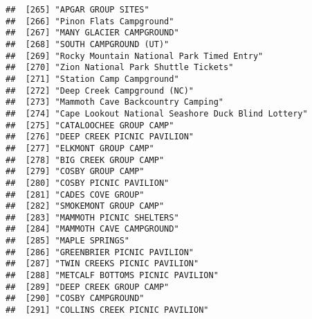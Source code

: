 \documentclass[
]{article}
\begin{document}
\begin{verbatim}
##  [265] "APGAR GROUP SITES"                                                                   
##  [266] "Pinon Flats Campground"                                                              
##  [267] "MANY GLACIER CAMPGROUND"                                                             
##  [268] "SOUTH CAMPGROUND (UT)"                                                               
##  [269] "Rocky Mountain National Park Timed Entry"                                            
##  [270] "Zion National Park Shuttle Tickets"                                                  
##  [271] "Station Camp Campground"                                                             
##  [272] "Deep Creek Campground (NC)"                                                          
##  [273] "Mammoth Cave Backcountry Camping"                                                    
##  [274] "Cape Lookout National Seashore Duck Blind Lottery"                                   
##  [275] "CATALOOCHEE GROUP CAMP"                                                              
##  [276] "DEEP CREEK PICNIC PAVILION"                                                          
##  [277] "ELKMONT GROUP CAMP"                                                                  
##  [278] "BIG CREEK GROUP CAMP"                                                                
##  [279] "COSBY GROUP CAMP"                                                                    
##  [280] "COSBY PICNIC PAVILION"                                                               
##  [281] "CADES COVE GROUP"                                                                    
##  [282] "SMOKEMONT GROUP CAMP"                                                                
##  [283] "MAMMOTH PICNIC SHELTERS"                                                             
##  [284] "MAMMOTH CAVE CAMPGROUND"                                                             
##  [285] "MAPLE SPRINGS"                                                                       
##  [286] "GREENBRIER PICNIC PAVILION"                                                          
##  [287] "TWIN CREEKS PICNIC PAVILION"                                                         
##  [288] "METCALF BOTTOMS PICNIC PAVILION"                                                     
##  [289] "DEEP CREEK GROUP CAMP"                                                               
##  [290] "COSBY CAMPGROUND"                                                                    
##  [291] "COLLINS CREEK PICNIC PAVILION"                                                       

\end{verbatim}
\end{document}
